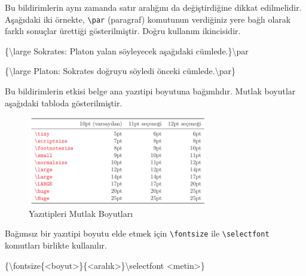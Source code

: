 \documentclass[
  letterpaper,
  DIV=11,
  numbers=noendperiod]{scrreprt}
\newenvironment{Shaded}{\begin{snugshade}}{\end{snugshade}}
\newcommand{\FunctionTok}[1]{\textcolor[rgb]{0.28,0.35,0.67}{#1}}
\newcommand{\NormalTok}[1]{\textcolor[rgb]{0.00,0.23,0.31}{#1}}
\begin{document}
Bu bildirimlerin aynı zamanda satır aralığını da değiştirdiğine dikkat
edilmelidir. Aşağıdaki iki örnekte, \texttt{\textbackslash{}par}
(paragraf) komutunun verdiğiniz yere bağlı olarak farklı sonuçlar
ürettiği gösterilmiştir. Doğru kullanım ikincisidir.

\begin{Shaded}
\begin{Highlighting}[]
\NormalTok{\{}\FunctionTok{\textbackslash{}large} 
\NormalTok{Sokrates: Platon}
\NormalTok{yalan söyleyecek}
\NormalTok{aşağıdaki cümlede.\}}\FunctionTok{\textbackslash{}par}
\end{Highlighting}
\end{Shaded}

\begin{Shaded}
\begin{Highlighting}[]
\NormalTok{\{}\FunctionTok{\textbackslash{}large}\NormalTok{ Platon: Sokrates}
\NormalTok{doğruyu söyledi}
\NormalTok{önceki cümlede.}\FunctionTok{\textbackslash{}par}\NormalTok{\}}
\end{Highlighting}
\end{Shaded}

Bu bildirimlerin etkisi belge ana yazıtipi boyutuna bağımlıdır. Mutlak
boyutlar aşağıdaki tabloda gösterilmiştir.

\begin{figure}

{\centering \includegraphics[width=0.7\textwidth,height=\textheight]{./images/yazitipi9.png}

}

\caption{Yazıtipleri Mutlak Boyutları}

\end{figure}

Bağımsız bir yazıtipi boyutu elde etmek için
\texttt{\textbackslash{}fontsize} ile
\texttt{\textbackslash{}selectfont} komutları birlikte kullanılır.

\begin{Shaded}
\begin{Highlighting}[]
\NormalTok{\{}\FunctionTok{\textbackslash{}fontsize}\NormalTok{\{\textless{}boyut\textgreater{}\}\{\textless{}aralık\textgreater{}\}}\FunctionTok{\textbackslash{}selectfont}\NormalTok{ \textless{}metin\textgreater{}\}}
\end{Highlighting}
\end{Shaded}
\end{document}
